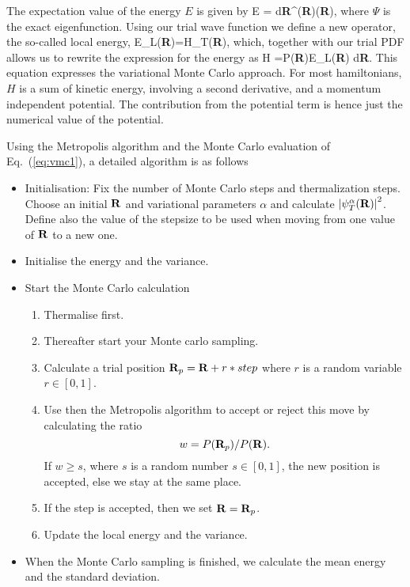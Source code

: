 The expectation value of the energy $E$
is given by
\be
   \langle E \rangle =
        {\int d{\bf R}\Psi^{\ast}({\bf R})\Psi({\bf R})},
\ee
where $\Psi$ is the exact eigenfunction. Using our trial
wave function we define a new operator, 
the so-called  
local energy, 
\be
   E_L({\bf R})=H\psi_T({\bf R}),
   \label{eq:locale1}
\ee
which, together with our trial PDF allows us to rewrite the 
expression for the energy as
\be
  \langle H \rangle =\int P({\bf R})E_L({\bf R}) d{\bf R}.
  \label{eq:vmc1}
\ee
This equation expresses the variational Monte Carlo approach.
For most hamiltonians, $H$ is a sum of kinetic energy, involving 
a second derivative, and a momentum independent potential. 
The contribution from the potential term is hence just the 
numerical value of the potential.

Using the Metropolis algorithm and the Monte Carlo 
evaluation of Eq.~(\ref{eq:vmc1}), a detailed algorithm is   
as follows
       \begin{itemize}
          \item Initialisation: Fix the number of Monte Carlo steps and 
                thermalization steps. Choose an initial ${\bf R}$ and
                variational parameters $\alpha$ and 
                calculate
                $\left|\psi_T^{\alpha}({\bf R})\right|^2$. 
                Define also the value 
                of the stepsize to be used when moving from one value of 
                ${\bf R}$ to a new one.
          \item Initialise the energy and the variance.
          \item Start the Monte Carlo calculation 
                \begin{enumerate}
                  \item Thermalise first.
                  \item Thereafter start your Monte carlo sampling.
                  \item Calculate  a trial position  ${\bf R}_p={\bf R}+r*step$
                        where $r$ is a random variable $r \in [0,1]$.
                  \item Use then the Metropolis algorithm to accept
                        or reject this move by calculating the ratio
                        \[
                           w = P({\bf R}_p)/P({\bf R}).
                        \]
                        If $w \ge s$, where $s$ is a random number
                          $s \in [0,1]$, 
                          the new position is accepted, else we 
                          stay at the same place.
                  \item If the step is accepted, then we set 
                        ${\bf R}={\bf R}_p$. 
                  \item Update the local energy and the variance.
                 \end{enumerate}
          \item When the Monte Carlo sampling is finished, 
we calculate the mean energy and the standard deviation.
      \end{itemize}



